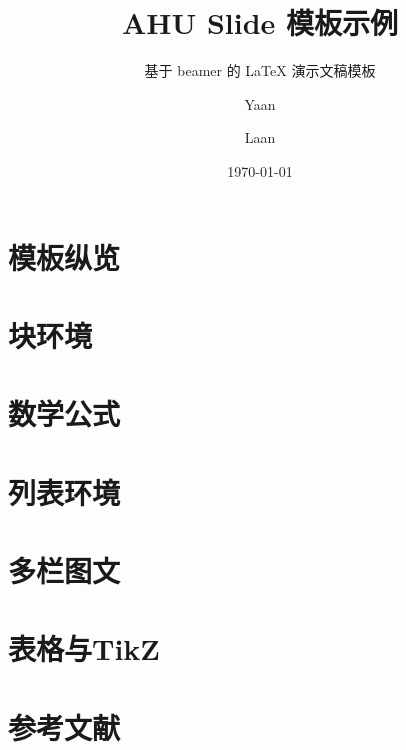 \documentclass[10pt,aspectratio=169]{beamer}
\title[AHU Slide 模板示例]{AHU Slide 模板示例}
\subtitle{基于 beamer 的 \LaTeX{} 演示文稿模板}
\author[Yaan \& Laan]{Yaan \and Laan}
\institute[AHU]{Anhui University}
\date[\today]{\today}
\begin{document}




\section{模板纵览}


\section{块环境}


\section{数学公式}


\section{列表环境}


\section{多栏图文}


\section{表格与TikZ}


\section{参考文献}



\end{document}
